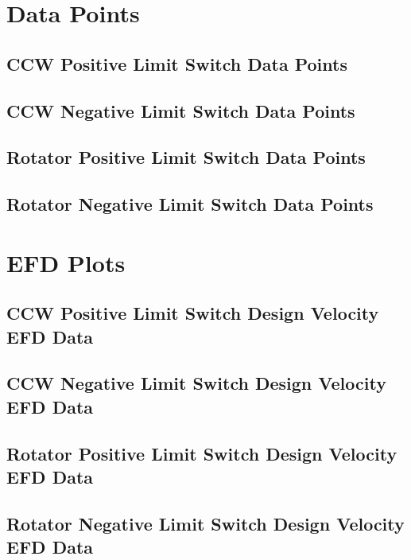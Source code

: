 \documentclass[SE,authoryear,toc]{lsstdoc}
\begin{document}
\section{Data Points} \label{sec:data}
\subsection{CCW Positive Limit Switch Data Points}
\subsection{CCW Negative Limit Switch Data Points}
\subsection{Rotator Positive Limit Switch Data Points}
\subsection{Rotator Negative Limit Switch Data Points}
\section{EFD Plots} \label{sec:efd}
\subsection{CCW Positive Limit Switch Design Velocity EFD Data}
\subsection{CCW Negative Limit Switch Design Velocity EFD Data}
\subsection{Rotator Positive Limit Switch Design Velocity EFD Data}
\subsection{Rotator Negative Limit Switch Design Velocity EFD Data}
\end{document}
